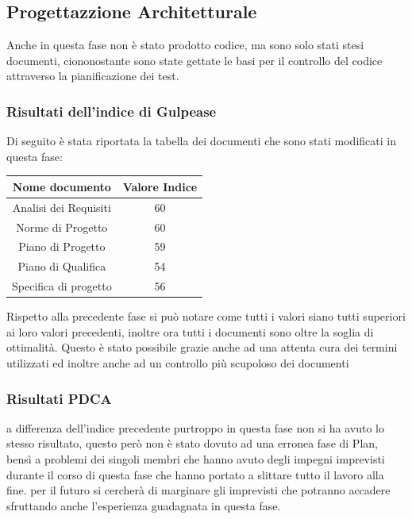 \documentclass[12pt,a4paper,titlepage]{article}
\begin{document}
    \subsection{Progettazzione Architetturale}
    
    Anche in questa fase non è stato prodotto codice, ma sono solo stati stesi documenti, ciononostante sono state gettate le basi per il controllo del codice attraverso la pianificazione dei test.\\
    
    \subsubsection{Risultati dell'indice di Gulpease}
     Di seguito è stata riportata la tabella dei documenti che sono stati modificati in questa fase:
    \begin{tabular}{|c|c|}
    	{\textbf{Nome documento}}&{\textbf{Valore Indice}}\\
    	\hline
    	Analisi dei Requisiti & 60\\
    	\hline
    	Norme di Progetto & 60\\
    	\hline
    	Piano di Progetto & 59\\
    	\hline
    	Piano di Qualifica & 54\\
    	\hline
    	Specifica di progetto & 56\\
    \end{tabular}
    Rispetto alla precedente fase si può notare come tutti i valori siano tutti superiori ai loro valori precedenti, inoltre ora tutti i documenti sono oltre la soglia di ottimalità. 
    Questo è stato possibile grazie anche ad una attenta cura dei termini utilizzati ed inoltre anche ad un controllo più scupoloso dei documenti
    
    \subsubsection{Risultati PDCA}
    a differenza dell'indice precedente purtroppo in questa fase non si ha avuto lo stesso risultato, questo però non è stato dovuto ad una erronea fase di Plan, bensì a problemi dei singoli membri che hanno avuto degli impegni imprevisti durante il corso di questa fase
    che hanno portato a slittare tutto il lavoro alla fine. per il futuro si cercherà di marginare gli imprevisti che potranno accadere sfruttando anche l'esperienza guadagnata in questa fase.
    
\end{document}
